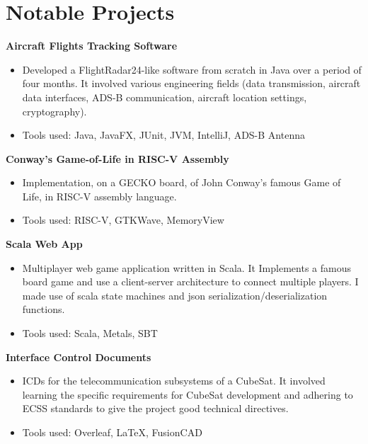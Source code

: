 \documentclass[a4paper, 10pt]{article}
\newenvironment{highlights}{
    \begin{itemize}[
        topsep=0.10 cm,
        parsep=0.10 cm,
        partopsep=0pt,
        itemsep=0pt,
        leftmargin=0.4 cm + 10pt
    ]
}{
    \end{itemize}
} %
\let\hrefWithoutArrow\href
\renewcommand{\href}[2]{\hrefWithoutArrow{#1}{\ifthenelse{\equal{#2}{}}{ }{#2 }\raisebox{.15ex}{\footnotesize \faExternalLink*}}}
\begin{document}
    \section{Notable Projects}

        \textbf{Aircraft Flights Tracking Software}\href{https://github.com/relogamimano/Javions}{}
        \begin{highlights}
            \item Developed a FlightRadar24-like software from scratch in Java over a period of four months. It involved various
            engineering fields (data transmission, aircraft data interfaces, ADS-B communication, aircraft location settings, cryptography).
            \item Tools used: Java, JavaFX, JUnit, JVM, IntelliJ, ADS-B Antenna
        \end{highlights}

        \textbf{Conway's Game-of-Life in RISC-V Assembly}\href{https://github.com/relogamimano/Conway-s-Game-of-Life-in-RISC-V-Assembly}{}
        \begin{highlights}
            \item Implementation, on a GECKO board, of John Conway's famous Game of Life, in RISC-V assembly language.
            \item Tools used: RISC-V, GTKWave, MemoryView
        \end{highlights}
        \textbf{Scala Web App}\href{https://github.com/relogamimano/Scala-Web-App}{}
        \begin{highlights}
            \item Multiplayer web game application written in Scala. It Implements a famous board game and use a client-server architecture to connect multiple players. I made use of scala state machines and json serialization/deserialization functions.
            \item Tools used: Scala, Metals, SBT
        \end{highlights}

        \textbf{Interface Control Documents}\href{https://drive.google.com/drive/folders/1KWNjMkGwcYpTIh6xBs-nddBK195R_ihb?usp=sharing}{}
        \begin{highlights}
            \item ICDs for the telecommunication subsystems of a CubeSat. It involved learning the specific requirements for CubeSat development and adhering to ECSS standards to give the project good technical directives.
            \item Tools used: Overleaf, LaTeX, FusionCAD
        \end{highlights}
\end{document}
